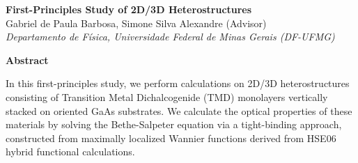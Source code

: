 \documentclass[12pt,a4paper]{article}
\begin{document}
\begin{center}
    \Large \textbf{First-Principles Study of 2D/3D Heterostructures} \\
    \vspace{0.5cm}
    \large Gabriel de Paula Barbosa, Simone Silva Alexandre (Advisor) \\
    \vspace{0.2cm}
    \normalsize \textit{Departamento de Física, Universidade Federal de Minas Gerais (DF-UFMG)}
\end{center}

\vspace{0.5cm}

\begin{center}
    \textbf{Abstract}
\end{center}

In this first-principles study, we perform calculations on 2D/3D heterostructures consisting of Transition Metal Dichalcogenide (TMD) monolayers vertically stacked on oriented GaAs substrates. We calculate the optical properties of these materials by solving the Bethe-Salpeter equation via a tight-binding approach, constructed from maximally localized Wannier functions derived from HSE06 hybrid functional calculations.
\end{document}
